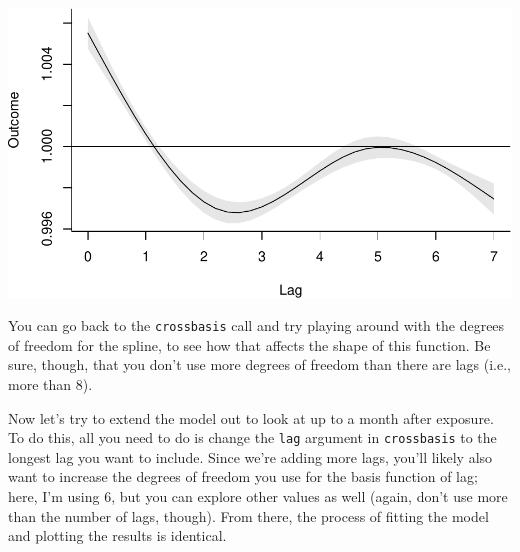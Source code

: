 \documentclass[
]{book}
\newenvironment{Shaded}{\begin{snugshade}}{\end{snugshade}}
\newcommand{\DataTypeTok}[1]{\textcolor[rgb]{0.13,0.29,0.53}{#1}}
\newcommand{\DecValTok}[1]{\textcolor[rgb]{0.00,0.00,0.81}{#1}}
\newcommand{\FloatTok}[1]{\textcolor[rgb]{0.00,0.00,0.81}{#1}}
\newcommand{\KeywordTok}[1]{\textcolor[rgb]{0.13,0.29,0.53}{\textbf{#1}}}
\newcommand{\NormalTok}[1]{#1}
\newcommand{\OperatorTok}[1]{\textcolor[rgb]{0.81,0.36,0.00}{\textbf{#1}}}
\newcommand{\StringTok}[1]{\textcolor[rgb]{0.31,0.60,0.02}{#1}}
\begin{document}
\begin{Shaded}
\end{Shaded}

\includegraphics{adv_epi_analysis_files/figure-latex/unnamed-chunk-100-1.pdf}

You can go back to the \texttt{crossbasis} call and try playing around with the degrees of freedom
for the spline, to see how that affects the shape of this function. Be sure, though, that
you don't use more degrees of freedom than there are lags (i.e., more than 8).

Now let's try to extend the model out to look at up to a month after exposure. To do this,
all you need to do is change the \texttt{lag} argument in \texttt{crossbasis} to the longest lag you
want to include. Since we're adding more lags, you'll likely also want to increase the
degrees of freedom you use for the basis function of lag; here, I'm using 6, but you can
explore other values as well (again, don't use more than the number of lags, though).
From there, the process of fitting the model and plotting the results is identical.
\end{document}
